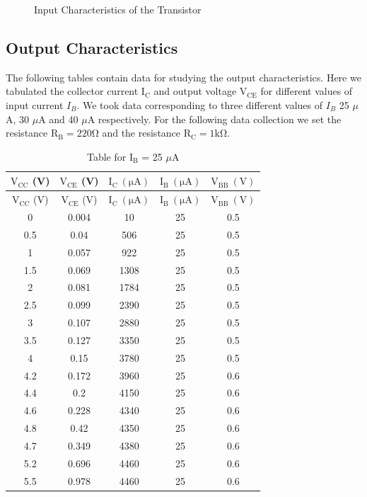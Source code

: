\documentclass[12pt]{article}
\begin{document}
\begin{figure}[H]
    \centering
    
    \caption{Input Characteristics of the Transistor}
\end{figure}

\subsection{Output Characteristics}
The following tables contain data for studying the output characteristics. Here we tabulated the collector current $\mathrm{I_C}$ and output voltage $\mathrm{V_{CE}}$ for different values of input current $I_B$. We took data corresponding to three different values of $I_B$ 25 $\mu$A, 30 $\mu$A and 40 $\mu$A respectively. For the following data collection we set the resistance \( \mathrm{R_B = 220 \Omega }\) and the resistance \( \mathrm{R_C = 1 k \Omega}\).

\begin{longtable}[H]{|c|c|c|c|c|}
    \caption{Table for \( \mathrm{I_B}\) = 25 \( \mu \)A }
    \endfirsthead
    \hline   
    $\mathrm{V_{CC}}$ (V) & $\mathrm{V_{CE}}$ (V) & $\mathrm{I_C \ (\mu A)}$ & $\mathrm{I_B \ (\mu A)}$ & $\mathrm{V_{BB} \ (V)}$ \\ \hline \hline
    \endhead 
    \hline   
    $\mathrm{V_{CC}}$ (V) & $\mathrm{V_{CE}}$ (V) & $\mathrm{I_C \ (\mu A)}$ & $\mathrm{I_B \ (\mu A)}$ & $\mathrm{V_{BB} \ (V)}$ \\ \hline \hline
       0 & 0.004 & 10 & 25 & 0.5 \\ \hline
       0.5 & 0.04 & 506 & 25 & 0.5 \\ \hline
       1 & 0.057 & 922 & 25 & 0.5 \\ \hline
       1.5 & 0.069 & 1308 & 25 & 0.5 \\ \hline
       2 & 0.081 & 1784 & 25 & 0.5 \\ \hline
       2.5 & 0.099 & 2390 & 25 & 0.5 \\ \hline
       3 & 0.107 & 2880 & 25 & 0.5 \\ \hline
       3.5 & 0.127 & 3350 & 25 & 0.5 \\ \hline
       4 & 0.15 & 3780 & 25 & 0.5 \\ \hline
       4.2 & 0.172 & 3960 & 25 & 0.6 \\ \hline
       4.4 & 0.2 & 4150 & 25 & 0.6 \\ \hline
       4.6 & 0.228 & 4340 & 25 & 0.6 \\ \hline
       4.8 & 0.42 & 4350 & 25 & 0.6 \\ \hline
       4.7 & 0.349 & 4380 & 25 & 0.6 \\ \hline
       5.2 & 0.696 & 4460 &	25 & 0.6 \\ \hline
       5.5 & 0.978 & 4460 &	25 & 0.6 \\ \hline
\end{longtable}
\end{document}
